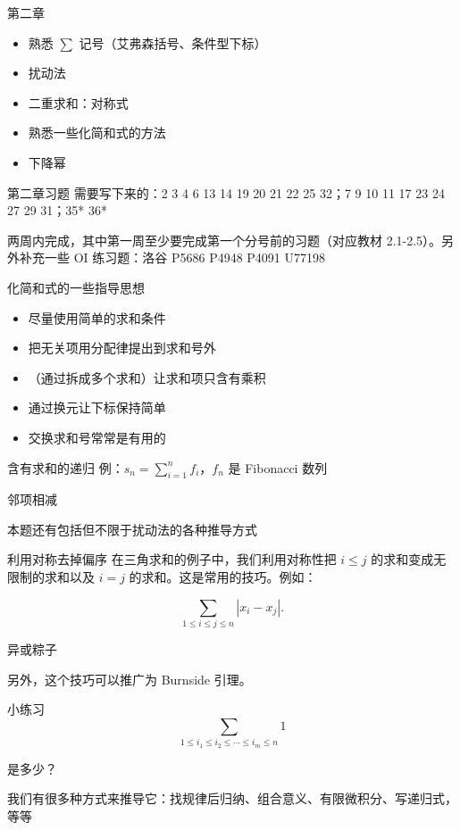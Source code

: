 \begin{frame}{第二章}
    \begin{itemize}
        \item 熟悉 $\displaystyle\sum$ 记号（艾弗森括号、条件型下标）
        \item 扰动法
        \item 二重求和：对称式
        \item 熟悉一些化简和式的方法
        \item 下降幂
    \end{itemize}
\end{frame}
\begin{frame}{第二章习题}
    需要写下来的：2 3 4 6 13 14 19 20 21 22 25 32；7 9 10 11 17 23 24 27 29 31；35* 36*

    两周内完成，其中第一周至少要完成第一个分号前的习题（对应教材 2.1-2.5）。另外补充一些 OI 练习题：洛谷 P5686 P4948 P4091 U77198
\end{frame}
\begin{frame}{化简和式的一些指导思想}
    \begin{itemize}
        \item 尽量使用简单的求和条件
        \item 把无关项用分配律提出到求和号外
        \item （通过拆成多个求和）让求和项只含有乘积
        \item 通过换元让下标保持简单
        \item 交换求和号常常是有用的
    \end{itemize}
\end{frame}
\begin{frame}{含有求和的递归}
    例：$s_n=\sum_{i=1}^n f_i$，$f_n$ 是 Fibonacci 数列

    邻项相减

    本题还有包括但不限于扰动法的各种推导方式
\end{frame}
\begin{frame}{利用对称去掉偏序}
    在三角求和的例子中，我们利用对称性把 $i\le j$ 的求和变成无限制的求和以及 $i=j$ 的求和。这是常用的技巧。例如：

    $$
    \sum_{1\le i\le j\le n}|x_i-x_j|.
    $$

    异或粽子

    另外，这个技巧可以推广为 Burnside 引理。
\end{frame}
\begin{frame}{小练习}
    $$
    \sum_{1\le i_1\le i_2\le\cdots\le i_m\le n} 1
    $$

    是多少？

    我们有很多种方式来推导它：找规律后归纳、组合意义、有限微积分、写递归式，等等
\end{frame}

